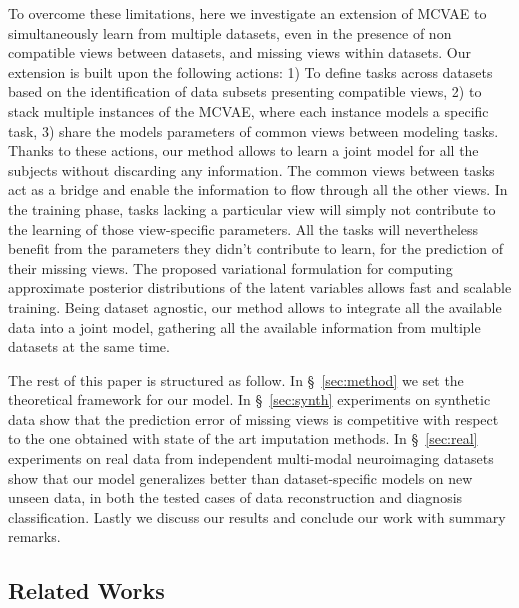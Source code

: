 To overcome these limitations, here we investigate an extension of MCVAE to simultaneously learn from multiple datasets, even in the presence of non compatible views between datasets, and missing views within datasets.
Our extension  is built upon the following actions:
1) To define tasks across datasets based on the identification of data subsets presenting compatible views,
2) to stack multiple instances of the MCVAE, where each instance models a specific task,
3) share the models parameters of common views between modeling tasks.
%
Thanks to these actions, our method allows to learn a joint model for all the subjects without discarding any information.
The common views between tasks act as a bridge and enable the information to flow through all the other views.
In the training phase, tasks lacking a particular view will simply not contribute to the learning of those view-specific parameters.
All the tasks will nevertheless benefit from the parameters they didn't contribute to learn, for the prediction of their missing views.
The proposed variational formulation for computing approximate posterior distributions of the latent variables allows fast and scalable training.
Being dataset agnostic, our method allows to integrate all the available data into a joint model, gathering  all the available information from multiple datasets at the same time.

The rest of this paper is structured as follow.
In \S~\ref{sec:method} we set the theoretical framework for our model.
In \S~\ref{sec:synth} experiments on synthetic data show that the prediction error of missing views is competitive with respect to the one obtained with state of the art imputation methods.
In \S~\ref{sec:real} experiments on real data from independent multi-modal neuroimaging datasets show that our model generalizes better than dataset-specific models on new unseen data, in both the tested cases of data reconstruction and diagnosis classification.
Lastly we discuss our results and conclude our work with summary remarks.

\subsection{Related Works}

